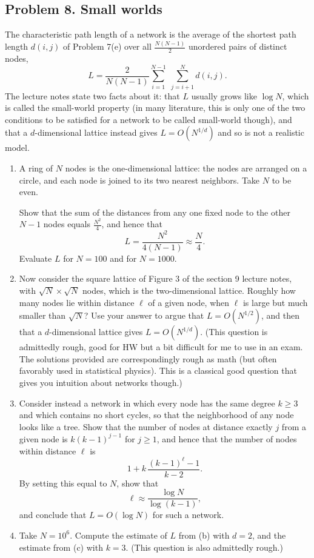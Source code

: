 \documentclass[a4paper,12pt]{article}
\begin{document}
\subsection*{Problem 8. Small worlds}

The characteristic path length of a network is the average of the shortest path length $d(i,j)$ of Problem 7(e) over all $\frac{N(N-1)}{2}$ unordered pairs of distinct nodes,
\[ L = \frac{2}{N(N-1)}\sum_{i=1}^{N-1}\;\sum_{j=i+1}^{N} d(i,j) . \]
The lecture notes state two facts about it: that $L$ usually grows like $\log N$, which is called the small-world property (in many literature, this is only one of the two conditions to be satisfied for a network to be called small-world though), and that a $d$-dimensional lattice instead gives $L = O\!\left( N^{1/d} \right)$ and so is not a realistic model.

\begin{enumerate}[label=(\alph*)]
\item A ring of $N$ nodes is the one-dimensional lattice: the nodes are arranged on a circle, and each node is joined to its two nearest neighbors. Take $N$ to be even.

Show that the sum of the distances from any one fixed node to the other $N-1$ nodes equals $\frac{N^2}{4}$, and hence that
\[ L = \frac{N^2}{4(N-1)} \approx \frac{N}{4} . \]
Evaluate $L$ for $N=100$ and for $N=1000$.

\item Now consider the square lattice of Figure 3 of the section 9 lecture notes, with $\sqrt{N} \times \sqrt{N}$ nodes, which is the two-dimensional lattice. Roughly how many nodes lie within distance $\ell$ of a given node, when $\ell$ is large but much smaller than $\sqrt{N}$? Use your answer to argue that $L = O\!\left( N^{1/2} \right)$, and then that a $d$-dimensional lattice gives $L = O\!\left( N^{1/d} \right)$. (This question is admittedly rough, good for HW but a bit difficult for me to use in an exam. The solutions provided are correspondingly rough as math (but often favorably used in statistical physics). This is a classical good question that gives you intuition about networks though.)

\item Consider instead a network in which every node has the same degree $k \geq 3$ and which contains no short cycles, so that the neighborhood of any node looks like a tree. Show that the number of nodes at distance exactly $j$ from a given node is $k(k-1)^{j-1}$ for $j \geq 1$, and hence that the number of nodes within distance $\ell$ is
\[ 1 + k\,\frac{(k-1)^{\ell}-1}{k-2} . \]
By setting this equal to $N$, show that
\[ \ell \approx \frac{\log N}{\log (k-1)} , \]
and conclude that $L=O\!\left( \log N \right)$ for such a network.

\item Take $N=10^6$. Compute the estimate of $L$ from (b) with $d=2$, and the estimate from (c) with $k=3$.
(This question is also admittedly rough.)

\end{enumerate}
\end{document}
